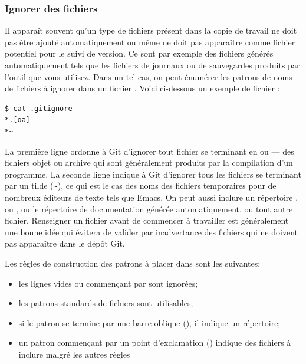 \subsubsection{Ignorer des fichiers}
\label{sec:git:ignoring}

Il apparaît souvent qu'un type de fichiers présent dans la copie de travail ne doit pas être ajouté automatiquement ou même ne doit pas apparaître comme fichier potentiel pour le suivi de version.
Ce sont par exemple des fichiers générés automatiquement tels que les fichiers de journaux ou de sauvegardes produits par l'outil que vous utilisez.
Dans un tel cas, on peut énumérer les patrons de noms de fichiers à ignorer dans un fichier .
Voici ci-dessous un exemple de fichier :
\begin{Schunk}
\begin{Verbatim}
$ cat .gitignore
*.[oa]
*~
\end{Verbatim}
\end{Schunk}

La première ligne ordonne à Git d'ignorer tout fichier se terminant en  ou  --- des fichiers objet ou archive qui sont généralement produits par la compilation d'un programme.
La seconde ligne indique à Git d'ignorer tous les fichiers se terminant par un tilde (\verb=~=), ce qui est le cas des noms des fichiers temporaires pour de nombreux éditeurs de texte tels que Emacs.
On peut aussi inclure un répertoire ,  ou , ou le répertoire de documentation générée automatiquement, ou tout autre fichier.
Renseigner un fichier  avant de commencer à travailler est généralement une bonne idée qui évitera de valider par inadvertance des fichiers qui ne doivent pas apparaître dans le dépôt Git.

Les règles de construction des patrons à placer dans  sont les suivantes:
\begin{itemize}
\item les lignes vides ou commençant par \code{\#} sont ignorées;
\item les patrons standards de fichiers sont utilisables;
\item si le patron se termine par une barre oblique (\code{/}), il indique un répertoire;
\item un patron commençant par un point d'exclamation (\code{!}) indique des fichiers à inclure malgré les autres règles
\end{itemize}

